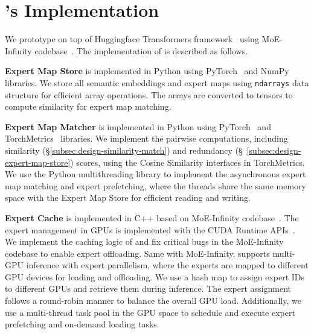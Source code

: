 \section{\sys's Implementation}
\label{sec:implement}


We prototype \sys on top of Huggingface Transformers framework~\cite{wolf2020huggingface} using MoE-Infinity codebase~\cite{moe-infinity-code}.
The implementation of \sys is described as follows.


\textbf{Expert Map Store} is implemented in Python using PyTorch~\cite{paszke2019pytorch} and NumPy~\cite{harris2020array} libraries.
We store all semantic embeddings and expert maps using \texttt{ndarrays} data structure for efficient array operations. The arrays are converted to tensors to compute similarity for expert map matching.


\textbf{Expert Map Matcher} is implemented in Python using PyTorch~\cite{paszke2019pytorch} and TorchMetrics~\cite{detlefsen2022torchmetrics} libraries.
We implement the pairwise computations, including similarity (\S\ref{subsec:design-similarity-match}) and redundancy (\S~\ref{subsec:design-expert-map-store}) scores, using the Cosine Similarity interfaces in TorchMetrics. 
We use the Python multithreading library to implement the asynchronous expert map matching and expert prefetching, where the threads share the same memory space with the Expert Map Store for efficient reading and writing.


\textbf{Expert Cache} is implemented in C++ based on MoE-Infinity codebase~\cite{moe-infinity-code}. 
The expert management in GPUs is implemented with the CUDA Runtime APIs~\cite{cuda-runtime-api}.
We implement the caching logic of \sys and fix critical bugs in the MoE-Infinity codebase to enable expert offloading.
Same with MoE-Infinity, \sys supports multi-GPU inference with expert parallelism, where the experts are mapped to different GPU devices for loading and offloading. We use a hash map to assign expert IDs to different GPUs and retrieve them during inference.
The expert assignment follows a round-robin manner to balance the overall GPU load.
Additionally, we use a multi-thread task pool in the GPU space to schedule and execute expert prefetching and on-demand loading tasks.